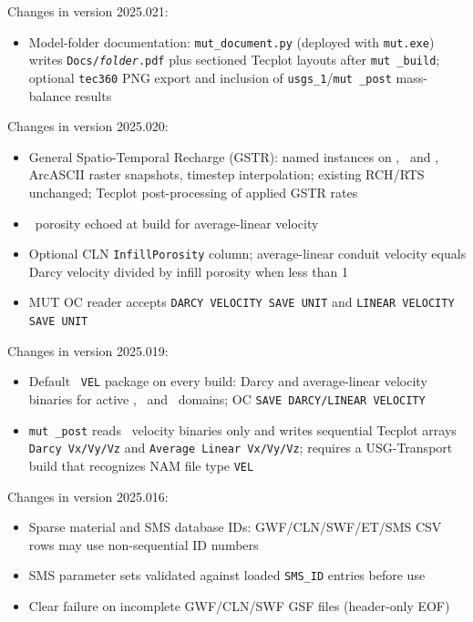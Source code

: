 \label{changes:2025.021}
Changes in version 2025.021:
\begin{itemize}
\item Model-folder documentation: \texttt{mut\_document.py} (deployed with \texttt{mut.exe}) writes \texttt{Docs/\textit{folder}.pdf} plus sectioned Tecplot layouts after \texttt{mut \_build}; optional \texttt{tec360} PNG export and inclusion of \texttt{usgs\_1}/\texttt{mut \_post} mass-balance results
\end{itemize}

\label{changes:2025.020}
Changes in version 2025.020:
\begin{itemize}
\item General Spatio-Temporal Recharge (GSTR): named instances on \gwf, \swf\ and \cln, ArcASCII raster snapshots, timestep interpolation; existing \textsf{RCH}/\textsf{RTS} unchanged; Tecplot post-processing of applied GSTR rates
\item \gwf\ porosity echoed at build for average-linear velocity
\item Optional CLN \texttt{InfillPorosity} column; average-linear conduit velocity equals Darcy velocity divided by infill porosity when less than 1
\item MUT OC reader accepts \texttt{DARCY VELOCITY SAVE UNIT} and \texttt{LINEAR VELOCITY SAVE UNIT}
\end{itemize}

\label{changes:2025.019}
Changes in version 2025.019:
\begin{itemize}
\item Default \mfus\ \texttt{VEL} package on every build: Darcy and average-linear velocity binaries for active \gwf, \cln\ and \swf\ domains; OC \texttt{SAVE DARCY/LINEAR VELOCITY}
\item \texttt{mut \_post} reads \mfus\ velocity binaries only and writes sequential Tecplot arrays \texttt{Darcy Vx/Vy/Vz} and \texttt{Average Linear Vx/Vy/Vz}; requires a USG-Transport build that recognizes NAM file type \texttt{VEL}
\end{itemize}

\label{changes:2025.016}
Changes in version 2025.016:
\begin{itemize}
\item Sparse material and SMS database IDs: GWF/CLN/SWF/ET/SMS CSV rows may use non-sequential ID numbers
\item SMS parameter sets validated against loaded \texttt{SMS\_ID} entries before use
\item Clear failure on incomplete GWF/CLN/SWF GSF files (header-only EOF)
\end{itemize}

